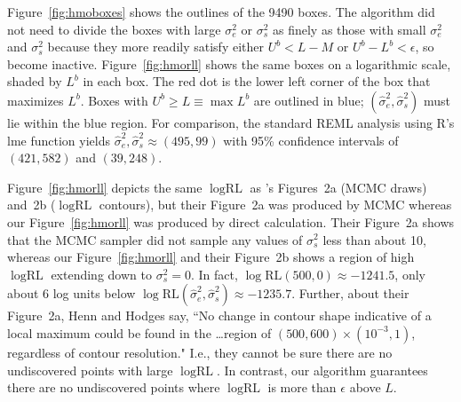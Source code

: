\documentclass{report}
\newcommand{\textcompute}{\textsf}
\newcommand{\R}{\textcompute{R}\xspace}
\newcommand{\RLorig}{\text{RL}}
\newcommand{\logRLorig}{\log\RLorig}
\newcommand{\sigssq}{\sigma_s^2}
\newcommand{\sigesq}{\sigma_e^2}
\newcommand{\sshat}{\hat\sigma^2_e,\hat\sigma^2_s}
\newcommand{\maxit}{\textcompute{maxit}}
\begin{document}
Figure~\ref{fig:hmoboxes} shows the outlines of the 9490 boxes.  The algorithm did not need to divide the boxes with large $\sigesq$ or $\sigssq$ as finely as those with small $\sigesq$ and $\sigssq$ because they more readily satisfy either $U^b < L-M$ or $U^b - L^b < \epsilon$, so become inactive.  Figure~\ref{fig:hmorll} shows the same boxes on a logarithmic scale, shaded by $L^b$ in each box.  The red dot is the lower left corner of the box that maximizes $L^b$.  Boxes with $U^b \ge L \equiv \max L^b$ are outlined in blue; $(\sshat)$ must lie within the blue region.  
For comparison, the standard REML analysis using \R's \textcompute{lme} function yields $\sshat \approx (495, 99)$ with 95\% confidence intervals of $(421, 582)$ and $(39, 248)$.

Figure~\ref{fig:hmorll} depicts the same $\logRLorig$ as \cite{henn&hodges:2014}'s Figures~2a (MCMC draws) and~2b ($\logRLorig$ contours), but their Figure~2a was produced by MCMC whereas our Figure~\ref{fig:hmorll} was produced by direct calculation.  Their Figure~2a shows that the MCMC sampler did not sample any values of $\sigssq$ less than about 10, whereas our Figure~\ref{fig:hmorll} and their Figure~2b shows a region of high $\logRLorig$ extending down to $\sigssq=0$.  In fact, $\logRLorig(500,0) \approx -1241.5$, only about 6 log units below $\logRLorig(\sshat) \approx -1235.7$.  Further, about their Figure~2a, Henn and Hodges say, ``No change in contour shape indicative of a local maximum could be found in the \dots region of $(500, 600) \times (10^{-3}, 1)$, regardless of contour resolution."  I.e., they cannot be sure there are no undiscovered points with large $\logRLorig$.  In contrast, our algorithm guarantees there are no undiscovered points where $\logRLorig$ is more than $\epsilon$ above $L$.
\end{document}
